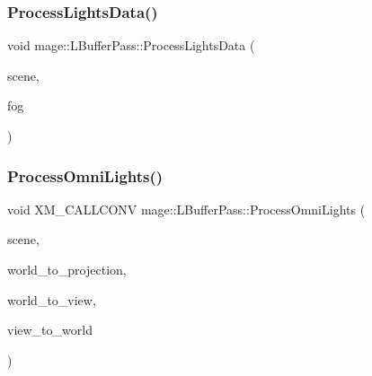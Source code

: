 \subsubsection{\texorpdfstring{Process\+Lights\+Data()}{ProcessLightsData()}}
{\footnotesize\ttfamily void mage\+::\+L\+Buffer\+Pass\+::\+Process\+Lights\+Data (\begin{DoxyParamCaption}\item[{const \hyperlink{classmage_1_1_scene}{Scene} \&}]{scene,  }\item[{const \hyperlink{classmage_1_1_fog}{Fog} \&}]{fog }\end{DoxyParamCaption})\hspace{0.3cm}{\ttfamily [private]}}

\hypertarget{structmage_1_1_l_buffer_pass_a6c33b00709c8440dbe3e1d37f6e0269a}{}\label{structmage_1_1_l_buffer_pass_a6c33b00709c8440dbe3e1d37f6e0269a} 
\subsubsection{\texorpdfstring{Process\+Omni\+Lights()}{ProcessOmniLights()}}
{\footnotesize\ttfamily void X\+M\+\_\+\+C\+A\+L\+L\+C\+O\+NV mage\+::\+L\+Buffer\+Pass\+::\+Process\+Omni\+Lights (\begin{DoxyParamCaption}\item[{const \hyperlink{classmage_1_1_scene}{Scene} \&}]{scene,  }\item[{F\+X\+M\+M\+A\+T\+R\+IX}]{world\+\_\+to\+\_\+projection,  }\item[{C\+X\+M\+M\+A\+T\+R\+IX}]{world\+\_\+to\+\_\+view,  }\item[{C\+X\+M\+M\+A\+T\+R\+IX}]{view\+\_\+to\+\_\+world }\end{DoxyParamCaption})\hspace{0.3cm}{\ttfamily [private]}}

\hypertarget{structmage_1_1_l_buffer_pass_a6886e49e2611592a73fc76cd4e4af307}{}\label{structmage_1_1_l_buffer_pass_a6886e49e2611592a73fc76cd4e4af307} 

